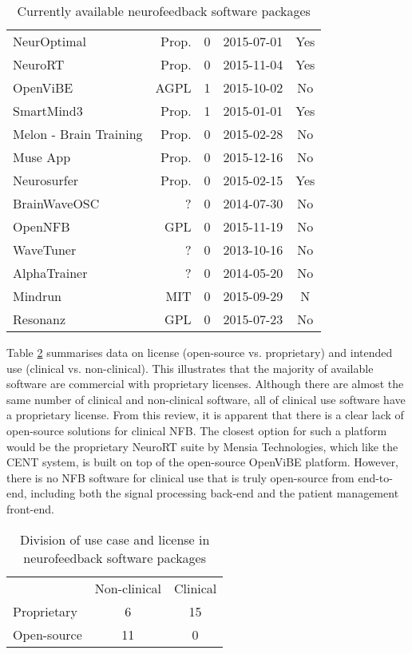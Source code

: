 \begin{table}[ht]
\begin{tabular}{lrrrc}
NeurOptimal & Prop. & 0 & 2015-07-01 & Yes \\
NeuroRT & Prop. & 0 & 2015-11-04 & Yes \\
OpenViBE & AGPL & 1 & 2015-10-02 & No \\
SmartMind3 & Prop. & 1 & 2015-01-01 & Yes \\
Melon - Brain Training & Prop. & 0 & 2015-02-28 & No \\
Muse App & Prop. & 0 & 2015-12-16 & No \\
Neurosurfer & Prop. & 0 & 2015-02-15 & Yes \\
BrainWaveOSC & ? & 0 & 2014-07-30 & No \\
OpenNFB & GPL & 0 & 2015-11-19 & No \\
WaveTuner & ? & 0 & 2013-10-16 & No \\
AlphaTrainer & ? & 0 & 2014-05-20 & No \\
Mindrun & MIT & 0 & 2015-09-29 & N\\
Resonanz & GPL & 0 & 2015-07-23 & No \\
\end{tabular}
    \caption{Currently available neurofeedback software packages}\label{nfbsoftware}
\end{table}


Table \ref{nfbsummary} summarises data on license (open-source vs. proprietary) and intended use (clinical vs. non-clinical). This illustrates that the majority of available software are commercial with  proprietary licenses. Although there are almost the same number of clinical and non-clinical software, all of clinical use software have a proprietary license. From this review, it is apparent that there is a clear lack of open-source solutions for clinical NFB. The closest option for such a platform would be the proprietary NeuroRT suite by Mensia Technologies, which like the CENT system, is built on top of the open-source OpenViBE platform. However, there is no NFB software for clinical use that is truly open-source from end-to-end, including both the signal processing back-end and the patient management front-end.


\begin{table}[h]
\centering
\begin{tabular}{lcc}
& Non-clinical  & Clinical \\       
Proprietary & 6 & 15 \\
Open-source  & 11 & 0 \\
\end{tabular}
    \caption{Division of use case and license in neurofeedback software packages}\label{nfbsummary}
\end{table}




